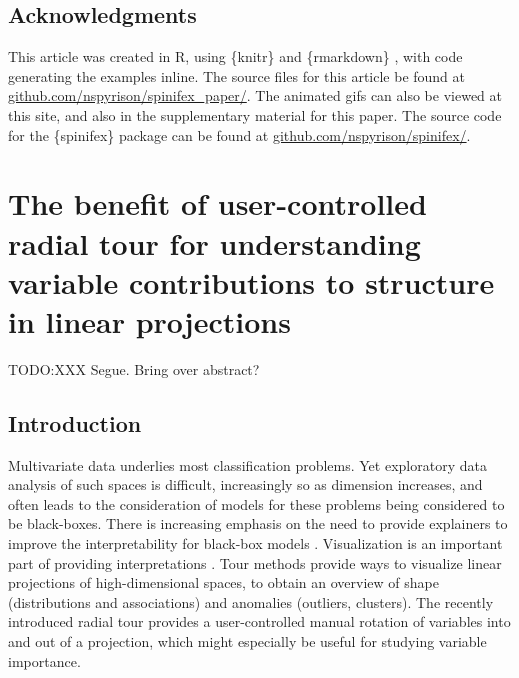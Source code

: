 \documentclass{template/monashthesis}
\begin{document}
\hypertarget{acknowledgments}{%
\section{Acknowledgments}\label{acknowledgments}}

This article was created in R, using \{knitr\} \autocite{xie_knitr_2020} and \{rmarkdown\} \autocite{allaire_rmarkdown_2020}, with code generating the examples inline. The source files for this article be found at \href{https://github.com/nspyrison/spinifex_paper/}{github.com/nspyrison/spinifex\_paper/}. The animated gifs can also be viewed at this site, and also in the supplementary material for this paper. The source code for the \{spinifex\} package can be found at \href{https://github.com/nspyrison/spinifex/}{github.com/nspyrison/spinifex/}.

\hypertarget{ch:efficacy_radial_tour}{%
\chapter{The benefit of user-controlled radial tour for understanding variable contributions to structure in linear projections}\label{ch:efficacy_radial_tour}}

TODO:XXX Segue. Bring over abstract?

\hypertarget{introduction-1}{%
\section{Introduction}\label{introduction-1}}

Multivariate data underlies most classification problems. Yet exploratory data analysis \autocite[EDA,][]{tukey_exploratory_1977} of such spaces is difficult, increasingly so as dimension increases, and often leads to the consideration of models for these problems being considered to be black-boxes. There is increasing emphasis on the need to provide explainers to improve the interpretability for black-box models \autocite{biecek_dalex_2018,biecek_explanatory_2021,lundberg_unified_2017,ribeiro_why_2016,wickham_visualizing_2015}. Visualization is an important part of providing interpretations \autocite{anscombe_graphs_1973,coleman_geometric_1986,goodman_dirty_2008,matejka_same_2017}. Tour methods \autocite{lee_review_2021,cook_grand_2008} provide ways to visualize linear projections of high-dimensional spaces, to obtain an overview of shape (distributions and associations) and anomalies (outliers, clusters). The recently introduced radial tour \autocite{spyrison_spinifex_2020} provides a user-controlled manual rotation of variables into and out of a projection, which might especially be useful for studying variable importance.
\end{document}
